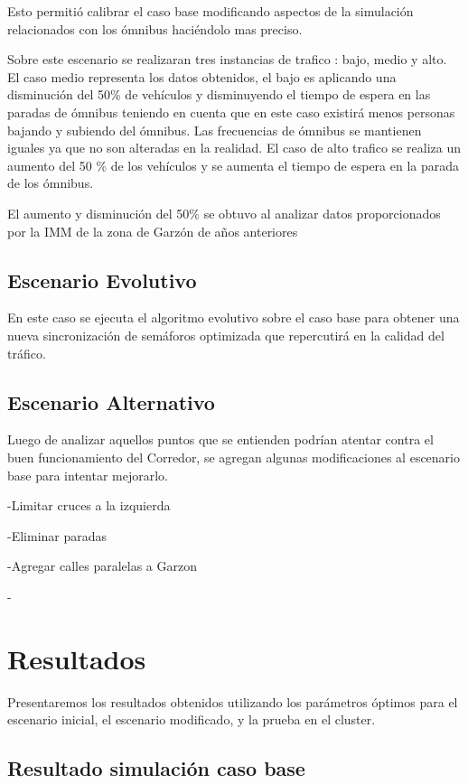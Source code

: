 Esto permitió calibrar el caso base modificando aspectos de la simulación relacionados con los ómnibus haciéndolo mas preciso.

Sobre este escenario se realizaran tres instancias de trafico : bajo, medio y alto.
El caso medio representa los datos obtenidos, el bajo es aplicando una disminución del 50\% de vehículos y disminuyendo el tiempo de espera en las paradas de ómnibus teniendo en cuenta que en este caso existirá menos personas bajando y subiendo del ómnibus. Las frecuencias de ómnibus se mantienen iguales ya que no son alteradas en la realidad.
El caso de alto trafico se realiza un aumento del 50 \% de los vehículos y se aumenta el tiempo de espera en la parada de los ómnibus.

El aumento y disminución del 50\% se obtuvo al analizar datos proporcionados por la IMM de la zona de Garzón de años anteriores 

\subsection{Escenario Evolutivo }
En este caso se ejecuta el algoritmo evolutivo sobre el caso base para obtener una nueva sincronización de semáforos optimizada que repercutirá en la calidad del tráfico.

\subsection{Escenario Alternativo}
Luego de analizar aquellos puntos que se entienden podrían atentar contra el buen funcionamiento del Corredor, se agregan algunas modificaciones al escenario base para intentar mejorarlo. 

-Limitar cruces a la izquierda

-Eliminar paradas

-Agregar calles paralelas a Garzon

-


\section{Resultados}
Presentaremos los resultados obtenidos  utilizando los parámetros óptimos  para el escenario inicial, el escenario modificado, y la prueba en el cluster.

\subsection{Resultado simulación caso base}

